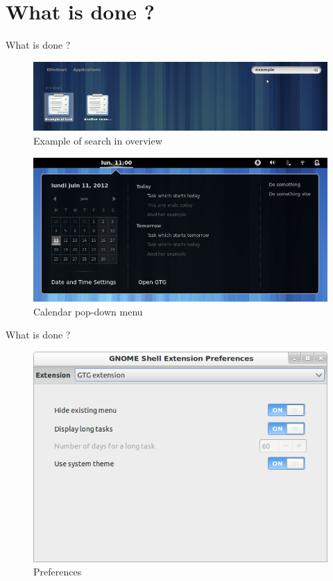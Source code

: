 \documentclass{beamer}
\begin{document}
	\section{What is done ?}
	\begin{frame}{What is done ?}
		\begin{figure}[!t]
			\centering
			\includegraphics[scale=0.28]{search.png}
			\tiny {\caption{Example of search in overview}}
		\end{figure}
		\begin{figure}[!t]
			\centering
			\includegraphics[scale=0.29]{calendar.png}
			\tiny {\caption{Calendar pop-down menu}}
		\end{figure}
	\end{frame}
	
	\begin{frame}{What is done ?}
		\begin{figure}
			\centering
			\includegraphics[scale=0.3]{prefs.png}
			\tiny {\caption{Preferences}}
		\end{figure}
	\end{frame}
	
\end{document}
